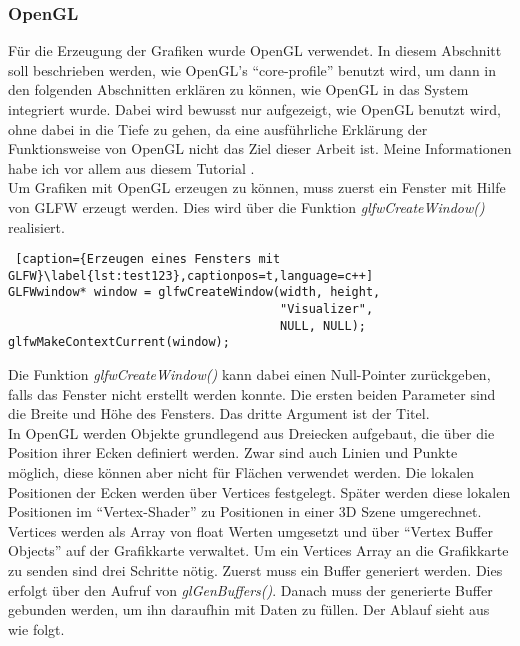 \documentclass[11pt,a4paper]{article}
\begin{document}
\subsubsection{OpenGL}
Für die Erzeugung der Grafiken wurde OpenGL verwendet. In diesem Abschnitt soll beschrieben werden, wie OpenGL's ``core-profile'' benutzt wird, um dann in den folgenden Abschnitten erklären zu können, wie OpenGL in das System integriert wurde. Dabei wird bewusst nur aufgezeigt, wie OpenGL benutzt wird, ohne dabei in die Tiefe zu gehen, da eine ausführliche Erklärung der Funktionsweise von OpenGL nicht das Ziel dieser Arbeit ist. Meine Informationen habe ich vor allem aus diesem Tutorial \cite{LearnOpenGL}.\\
Um Grafiken mit OpenGL erzeugen zu können, muss zuerst ein Fenster mit Hilfe von GLFW erzeugt werden. Dies wird über die Funktion \mbox{\textit{glfwCreateWindow()}} realisiert.

\begin{lstlisting} [caption={Erzeugen eines Fensters mit GLFW}\label{lst:test123},captionpos=t,language=c++]
GLFWwindow* window = glfwCreateWindow(width, height,
                                      "Visualizer",
                                      NULL, NULL);
glfwMakeContextCurrent(window);
\end{lstlisting}
\noindent
Die Funktion \mbox{\textit{glfwCreateWindow()}} kann dabei einen Null-Pointer zurückgeben, falls das Fenster nicht erstellt werden konnte. Die ersten beiden Parameter sind die Breite und Höhe des Fensters. Das dritte Argument ist der Titel.\\
In OpenGL werden Objekte grundlegend aus Dreiecken aufgebaut, die über die Position ihrer Ecken definiert werden. Zwar sind auch Linien  und Punkte möglich, diese können aber nicht für Flächen verwendet werden. Die lokalen Positionen der Ecken werden über Vertices festgelegt. Später werden diese lokalen Positionen im ``Vertex-Shader'' zu Positionen in einer 3D Szene umgerechnet.\\
Vertices werden als Array von float Werten umgesetzt und über ``Vertex Buffer Objects'' auf der Grafikkarte verwaltet. Um ein Vertices Array an die Grafikkarte zu senden sind drei Schritte nötig. Zuerst muss ein Buffer generiert werden. Dies erfolgt über den Aufruf von \mbox{\textit{glGenBuffers()}}. Danach muss der generierte Buffer gebunden werden, um ihn daraufhin mit Daten zu füllen. Der Ablauf sieht aus wie folgt.
\end{document}
